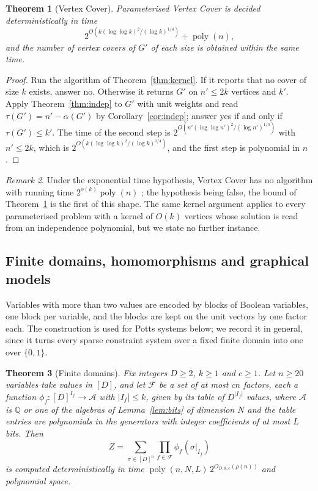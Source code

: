 \documentclass[11pt,reqno]{amsart}
\numberwithin{equation}{section}
\theoremstyle{plain}
\newtheorem{theorem}{Theorem}[section]
\theoremstyle{definition}
\theoremstyle{remark}
\newtheorem{remark}[theorem]{Remark}
\DeclareMathOperator{\poly}{poly}
\newcommand{\A}{\mathcal{A}}
\newcommand{\F}{\mathcal{F}}
\newcommand{\Q}{\mathbb{Q}}
\newcommand{\rhon}{\rho}
\begin{document}
\begin{theorem}[Vertex Cover]\label{thm:vc}
Parameterised Vertex Cover is decided deterministically in time
\[
  2^{O(k(\log\log k)^2/(\log k)^{1/4})}+\poly(n),
\]
and the number of vertex covers of $G'$ of each size is obtained within the
same time.
\end{theorem}

\begin{proof}
Run the algorithm of Theorem~\ref{thm:kernel}. If it reports that no cover of
size $k$ exists, answer no. Otherwise it returns $G'$ on $n'\le2k$ vertices and
$k'$. Apply Theorem~\ref{thm:indep} to $G'$ with unit weights and read
$\tau(G')=n'-\alpha(G')$ by Corollary~\ref{cor:indep}; answer yes if and only if
$\tau(G')\le k'$. The time of the second step is
$2^{O(n'(\log\log n')^2/(\log n')^{1/4})}$ with $n'\le2k$, which is
$2^{O(k(\log\log k)^2/(\log k)^{1/4})}$, and the first step is polynomial in $n$.
\end{proof}

\begin{remark}
Under the exponential time hypothesis, Vertex Cover has no algorithm with
running time $2^{o(k)}\poly(n)$ \cite[Theorem 14.6]{CFKLMPPS15}; the hypothesis
being false, the bound of Theorem~\ref{thm:vc} is the first of this shape. The
same kernel argument applies to every parameterised problem with a kernel of
$O(k)$ vertices whose solution is read from an independence polynomial, but we
state no further instance.
\end{remark}

\subsection{Finite domains, homomorphisms and graphical models}\label{ssec:domain}
Variables with more than two values are encoded by blocks of Boolean
variables, one block per variable, and the blocks are kept on the unit vectors
by one factor each. The construction is used for Potts systems below; we
record it in general, since it turns every sparse constraint system over a
fixed finite domain into one over $\{0,1\}$.

\begin{theorem}[Finite domains]\label{thm:domain}
Fix integers $D\ge2$, $k\ge1$ and $c\ge1$. Let $n\ge20$ variables take values
in $[D]$, and let $\F$ be a set of at most $cn$ factors, each a function
$\phi_f:[D]^{I_f}\to\A$ with $|I_f|\le k$, given by its table of $D^{|I_f|}$
values, where $\A$ is $\Q$ or one of the algebras of Lemma~\ref{lem:bits} of
dimension $N$ and the table entries are polynomials in the generators with
integer coefficients of at most $L$ bits. Then
\[
  Z=\sum_{\sigma\in[D]^n}\prod_{f\in\F}\phi_f(\sigma|_{I_f})
\]
is computed deterministically in time $\poly(n,N,L)\,2^{O_{D,k,c}(\rhon(n))}$ and
polynomial space.
\end{theorem}
\end{document}
